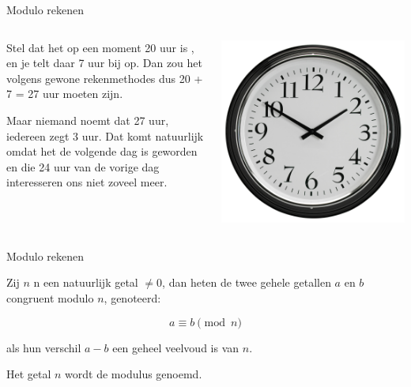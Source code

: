 \documentclass{beamer}
\begin{document}
\begin{frame}{Modulo rekenen}
	\begin{columns}
		\begin{column}[T]{0.5\textwidth}
			Stel dat het op een moment 20 uur is  , en je telt daar 7 uur bij op. Dan zou het volgens gewone rekenmethodes dus 20 + 7 = 27 uur moeten zijn.
			
			Maar niemand noemt dat 27 uur, iedereen zegt 3 uur. Dat komt natuurlijk omdat het de volgende dag is geworden en die 24 uur van de vorige dag interesseren ons niet zoveel meer.
		\end{column}
		
		\begin{column}[T]{0.5\textwidth}
				\includegraphics[width=\textwidth]{img/clock.jpg}
		\end{column}
	\end{columns}
\end{frame}

\begin{frame}{Modulo rekenen}

	Zij $n$ n een natuurlijk getal $\neq 0$, dan heten de twee gehele getallen $a$ en $b$ congruent modulo $n$, genoteerd:
	
	\[ 
		a \equiv b \pmod{n}
	\]
	
	als hun verschil $a - b$ een geheel veelvoud is van $n$.
	
	Het getal $n$ wordt de modulus genoemd.
	
\end{frame}
\end{document}
